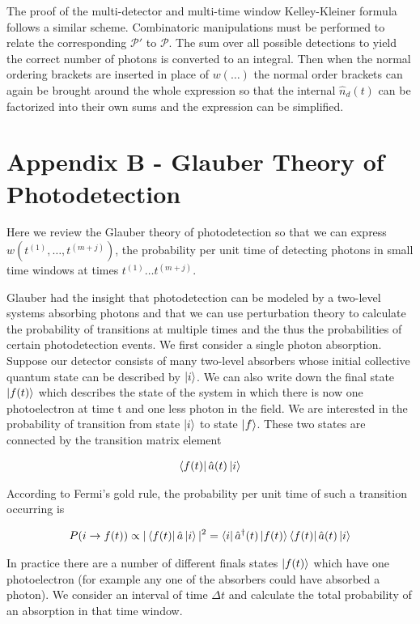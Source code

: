 \documentclass[12pt]{article}
\begin{document}
The proof of the multi-detector and multi-time window Kelley-Kleiner formula follows a similar scheme. Combinatoric manipulations must be performed to relate the corresponding $\mathcal{P'}$ to $\mathcal{P}$. The sum over all possible detections to yield the correct number of photons is converted to an integral. Then when the normal ordering brackets are inserted in place of $w(\ldots)$ the normal order brackets can again be brought around the whole expression so that the internal $\hat{n}_d(t)$ can be factorized into their own sums and the expression can be simplified.

\section{Appendix B - Glauber Theory of Photodetection}

Here we review the Glauber theory of photodetection so that we can express $w(t^{(1)}, \ldots, t^{(m+j)})$, the probability per unit time of detecting photons in small time windows at times $t^{(1)} \ldots t^{(m+j)}$.

Glauber had the insight that photodetection can be modeled by a two-level systems absorbing photons and that we can use perturbation theory to calculate the probability of transitions at multiple times and the thus the probabilities of certain photodetection events. We first consider a single photon absorption. Suppose our detector consists of many two-level absorbers whose initial collective quantum state can be described by $\ket{i}$. We can also write down the final state $\ket{f(t)}$ which describes the state of the system in which there is now one photoelectron at time t and one less photon in the field. We are interested in the probability of transition from state $\ket{i}$ to state $\ket{f}$. These two states are connected by the transition matrix element

\begin{align}
\bra{f(t)}\hat{a}(t)\ket{i}
\end{align}

According to Fermi's gold rule, the probability per unit time of such a transition occurring is

\begin{align}
P(i \rightarrow f(t)) \propto |\bra{f(t)}\hat{a}\ket{i}|^2 = \bra{i} \hat{a}^{\dag}(t) \ket{f(t)}\bra{f(t)}\hat{a}(t)\ket{i}
\end{align}

In practice there are a number of different finals states $\ket{f(t)}$ which have one photoelectron (for example any one of the absorbers could have absorbed a photon). We consider an interval of time $\Delta t$ and calculate the total probability of an absorption in that time window.
\end{document}
